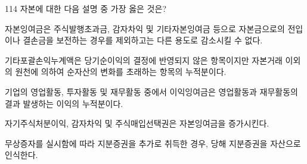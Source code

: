 \begin{question}{114}
자본에 대한 다음 설명 중 가장 옳은 것은?
\begin{choices}
  \item 자본잉여금은 주식발행초과금, 감자차익 및 기타자본잉여금 등으로 자본금으로의 전입이나 결손금을 보전하는 경우를 제외하고는 다른 용도로 감소시킬 수 없다.
  \item 기타포괄손익누계액은 당기순이익의 결정에 반영되지 않은 항목이지만 자본거래 이외의 원천에 의하여 순자산의 변화를 초래하는 항목의 누적분이다.
  \item 기업의 영업활동, 투자활동 및 재무활동 중에서 이익잉여금은 영업활동과 재무활동의 결과 발생하는 이익의 누적분이다.
  \item 자기주식처분이익, 감자차익 및 주식매입선택권은 자본잉여금을 증가시킨다.
  \item 무상증자를 실시함에 따라 지분증권을 추가로 취득한 경우, 당해 지분증권을 자산으로 인식한다.
\end{choices}
\end{question}
